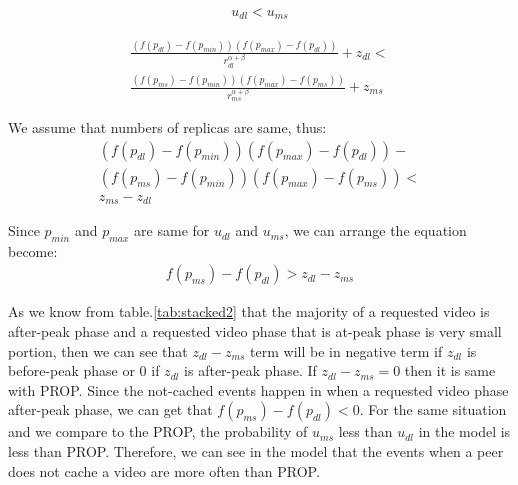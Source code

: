 \begin{align}\label{eq:dlms_1}
u_{dl} < u_{ms}
\end{align}

\begin{multline}\label{eq:dlms_2}
\frac{ (f(p_{dl}) - f(p_{min})) (f(p_{max}) - f(p_{dl})) }{r^{\alpha + \beta}_{dl}} + z_{dl} < \\
\frac{ (f(p_{ms}) - f(p_{min})) (f(p_{max}) - f(p_{ms})) }{r^{\alpha + \beta}_{ms}} + z_{ms}
\end{multline}

We assume that numbers of replicas are same, thus:
\begin{multline}\label{eq:dlms_3}
(f(p_{dl}) - f(p_{min})) (f(p_{max}) - f(p_{dl})) - \\ 
(f(p_{ms}) - f(p_{min})) (f(p_{max}) - f(p_{ms})) < \\
z_{ms} - z_{dl}
\end{multline}

Since $p_{min}$ and $p_{max}$ are same for $u_{dl}$ and $u_{ms}$, we can arrange the equation become:
\begin{align}\label{eq:dlms_4}
f(p_{ms}) - f(p_{dl}) > z_{dl} - z_{ms}
\end{align}


As we know from table.\ref{tab:stacked2} that the majority of a requested video is after-peak phase and a requested video phase that is  at-peak phase is very small portion, then we can see that $z_{dl} - z_{ms}$ term will be in negative term if $z_{dl}$ is  before-peak phase or $0$ if $z_{dl}$ is  after-peak phase. 
If $z_{dl} - z_{ms}=0$ then it is same with PROP. 
Since the not-cached events happen in when a requested video phase after-peak phase, we can get that $f(p_{ms}) - f(p_{dl}) < 0$.
For the same situation and we compare to the PROP, the probability of $u_{ms}$ less than $u_{dl}$ in the model is less than PROP. 
Therefore, we can see in the model that the events when a peer does not cache a video are more often than PROP.

